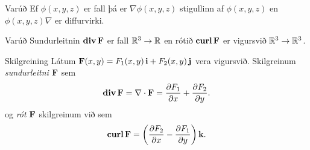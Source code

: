 \begin{frame}{} 

\begin {block}{Varúð \rtask{}}
  Ef $\phi(x,y,z)$ er fall þá er $\nabla \phi(x,y,z)$ 
stigullinn af $\phi(x,y,z)$ en $\phi(x,y,z)\nabla$ er diffurvirki.
\end{block}

\end{frame}




\begin{frame}{} 

\begin {block}{Varúð \rtask{}}
 Sundurleitnin $\mbox{${\rm\bf div\,}$}\mbox{${\bf F}$}$ er fall ${\mathbb R}^3\rightarrow{\mathbb R}$ en rótið $\mbox{${\rm\bf curl\,}$}\mbox{${\bf F}$}$ er vigursvið ${\mathbb R}^3\rightarrow{\mathbb R}^3$.
\end{block}

\end{frame}




\begin{frame}{} 

\begin {block}{Skilgreining \rtask{}}
 Látum
$\mbox{${\bf F}$}(x,y)=F_1(x,y)\,\mbox{${\bf i}$}+F_2(x,y)\,\mbox{${\bf j}$}$ vera vigursvið.  Skilgreinum
{\em sundurleitni} $\mbox{${\bf F}$}$ sem  
$$\mbox{${\rm\bf div\,}$}\mbox{${\bf F}$}=\nabla\cdot\mbox{${\bf F}$}=\frac{\partial F_1}{\partial
  x}+\frac{\partial F_2}{\partial y}.$$ 
og {\em rót} $\mbox{${\bf F}$}$ skilgreinum við sem 
$$\mbox{${\rm\bf curl\,}$}\mbox{${\bf F}$}=\bigg(\frac{\partial F_2}{\partial x}-\frac{\partial
  F_1}{\partial y}\bigg)\,\mbox{${\bf k}$}.$$ 
\end{block}

\end{frame}




